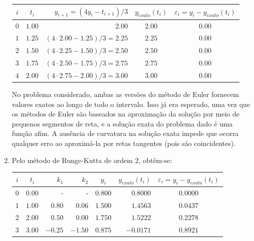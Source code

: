 \documentclass[12pt,a4paper]{article}
\begin{document}
\begin{ExerciseList}
\begin{enumerate}
\begin{center}
\begin{tabular}{|c|c|r|c|c|}
\hline
$i$ & $t_i$ & $y_{i+1} = (4y_i-t_{i+1})/3$ & $y_{exato}(t_i)$ & $\varepsilon_i = y_i-y_{exato}(t_i)$ \\ \hline\hline
$0$ & $1.00$ & $2.00$ & $2.00$ & $0.00$ \\ \hline
$1$ & $1.25$ & $(4 \cdot 2.00-1.25)/3 = 2.25$ & $2.25$ & $0.00$ \\ \hline
$2$ & $1.50$ & $(4 \cdot 2.25-1.50)/3 = 2.50$ & $2.50$ & $0.00$ \\ \hline
$3$ & $1.75$ & $(4 \cdot 2.50-1.75)/3 = 2.75$ & $2.75$ & $0.00$ \\ \hline
$4$ & $2.00$ & $(4 \cdot 2.75-2.00)/3 = 3.00$ & $3.00$ & $0.00$ \\ \hline
\end{tabular}
\end{center}
No problema considerado, ambas as versões do método de Euler fornecem valores exatos ao longo de todo o intervalo. Isso já era esperado, uma vez que os métodos de Euler são baseados na aproximação da solução por meio de pequenos segmentos de reta, e a solução exata do problema dado é uma função afim. A ausência de curvatura na solução exata impede que ocorra qualquer erro ao aproximá-la por retas tangentes (pois são coincidentes).

\item Pelo método de Runge-Kutta de ordem 2, obtêm-se:
\begin{center}
\begin{tabular}{|c|c|r|r|c|r|c|}
\hline
  $i$
& $t_i$
& $k_1$
& $k_2$
& $y_i$
& $y_{exato}(t_i)$
& $\varepsilon_i = y_i-y_{exato}(t_i)$ \\ \hline\hline
$0$ & $0.00$ &   -     &   -     & $ 0.800$ & $ 0.8000$ & $0.0000$ \\ \hline
$1$ & $1.00$ & $ 0.80$ & $ 0.06$ & $ 1.500$ & $ 1.4563$ & $0.0437$ \\ \hline
$2$ & $2.00$ & $ 0.50$ & $ 0.00$ & $ 1.750$ & $ 1.5222$ & $0.2278$ \\ \hline
$3$ & $3.00$ & $-0.25$ & $-1.50$ & $ 0.875$ & $-0.0171$ & $0.8921$ \\ \hline
\end{tabular}
\end{center}


\end{enumerate}
\end{ExerciseList}
\end{document}
